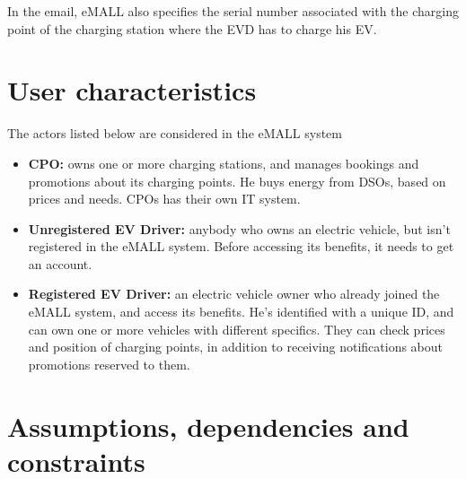 In the email, eMALL also specifies the serial number associated with the charging point of the charging station where the EVD has to charge his EV\@.


\section{User characteristics}
\label{sec:user_characteristics}%
The actors listed below are considered in the eMALL system
\begin{itemize}
    \item \textbf{CPO:} owns one or more charging stations, and manages bookings and promotions about its charging points.
    He buys energy from DSOs, based on prices and needs.
    CPOs has their own IT system.
    \item \textbf{Unregistered EV Driver:} anybody who owns an electric vehicle, but isn’t registered in the eMALL system.
    Before accessing its benefits, it needs to get an account.
    \item \textbf{Registered EV Driver:} an electric vehicle owner who already joined the eMALL system, and access its benefits.
    He’s identified with a unique ID, and can own one or more vehicles with different specifics.
    They can check prices and position of charging points, in addition to receiving notifications about promotions reserved to them.
\end{itemize}


\section{Assumptions, dependencies and constraints}
\label{sec:assumptions_dependencies_and_constraints}%
